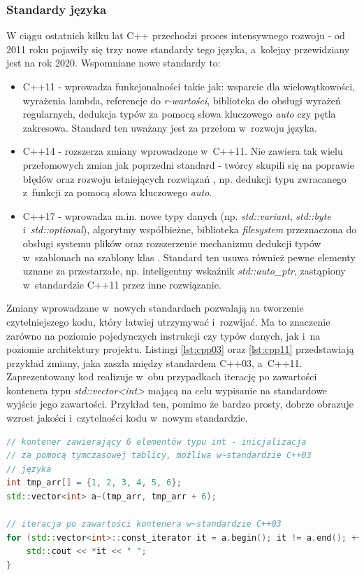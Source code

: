 \subsubsection*{Standardy języka}
W ciągu ostatnich kilku lat C++ przechodzi proces intensywnego rozwoju - od 2011 roku pojawiły się trzy nowe standardy tego języka, a~kolejny przewidziany jest na rok 2020. Wspomniane nowe standardy to:
\begin{itemize}
\item C++11 - wprowadza funkcjonalności takie jak: wsparcie dla wielowątkowości, wyrażenia lambda, referencje do \textit{r-wartości}, biblioteka do obsługi wyrażeń regularnych, dedukcja typów za pomocą słowa kluczowego \textit{auto} czy pętla zakresowa. Standard ten uważany jest za przełom w~rozwoju języka.
\item C++14 - rozszerza zmiany wprowadzone w~C++11. Nie zawiera tak wielu przełomowych zmian jak poprzedni standard - twórcy skupili się na poprawie błędów oraz rozwoju istniejących rozwiązań \cite{Cpp14Wikipedia}, np. dedukcji typu zwracanego z~funkcji za pomocą słowa kluczowego \textit{auto}.
\item C++17 - wprowadza m.in. nowe typy danych (np. \textit{std::variant}, \textit{std::byte} i~\textit{std::optional}), algorytmy współbieżne, biblioteka \textit{filesystem} przeznaczona do obsługi systemu plików oraz rozszerzenie mechanizmu dedukcji typów w~szablonach na szablony klas \cite{BartekCodingBlogCpp17}. Standard ten usuwa również pewne elementy uznane za przestarzałe, np. inteligentny wskaźnik \textit{std::auto\_ptr}, zastąpiony w~standardzie C++11 przez inne rozwiązanie.
\end{itemize} 
Zmiany wprowadzane w~nowych standardach pozwalają na tworzenie czytelniejszego kodu, który łatwiej utrzymywać i~rozwijać. Ma to znaczenie zarówno na poziomie pojedynczych instrukcji czy typów danych, jak i~na poziomie architektury projektu. Listingi \ref{lst:cpp03} oraz \ref{lst:cpp11} przedstawiają przykład zmiany, jaka zaszła między standardem C++03, a~C++11. Zaprezentowany kod realizuje w~obu przypadkach iterację po zawartości kontenera typu \textit{std::vector<int>} mającą na celu wypisanie na standardowe wyjście jego zawartości. Przykład ten, pomimo że bardzo prosty, dobrze obrazuje wzrost jakości i~czytelności kodu w~nowym standardzie.

\begin{lstlisting}[language=c++,caption={Przykład kodu w~języku C++ napisany z~wykorzystaniem standardu C++03},label={lst:cpp03}]
// kontener zawierający 6 elementów typu int - inicjalizacja
// za pomocą tymczasowej tablicy, możliwa w~standardzie C++03
// języka
int tmp_arr[] = {1, 2, 3, 4, 5, 6};
std::vector<int> a~(tmp_arr, tmp_arr + 6);

// iteracja po zawartości kontenera w~standardzie C++03
for (std::vector<int>::const_iterator it = a.begin(); it != a.end(); ++it) {
    std::cout << *it << " ";
}
\end{lstlisting}

